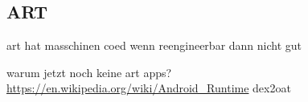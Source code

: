 \subsection{ART}\label{subsection:external-art}
art hat masschinen coed\newline
wenn reengineerbar dann nicht gut

warum jetzt noch keine art apps?
\url{https://en.wikipedia.org/wiki/Android_Runtime}\newline
dex2oat\newline
